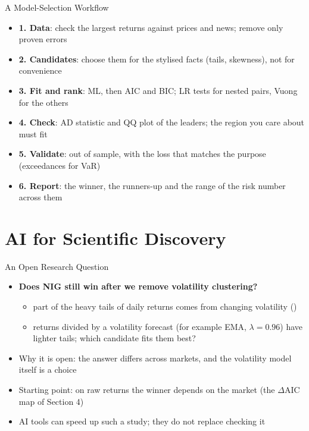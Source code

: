 \begin{frame}{A Model-Selection Workflow}
\itemsize{\small}
\begin{itemize}
    \item \textbf{1. Data}: check the largest returns against prices and news; remove only proven errors
    \item \textbf{2. Candidates}: choose them for the stylised facts (tails, skewness), not for convenience
    \item \textbf{3. Fit and rank}: ML, then AIC and BIC; LR tests for nested pairs, Vuong for the others
    \item \textbf{4. Check}: AD statistic and QQ plot of the leaders; the region you care about must fit
    \item \textbf{5. Validate}: out of sample, with the loss that matches the purpose (exceedances for VaR)
    \item \textbf{6. Report}: the winner, the runners-up and the range of the risk number across them
\end{itemize}
\end{frame}


\section{AI for Scientific Discovery}

\begin{frame}{An Open Research Question}
\itemsize{\small}
\begin{itemize}
    \item \textbf{Does NIG still win after we remove volatility clustering?}
    \begin{itemize}
        \item part of the heavy tails of daily returns comes from changing volatility ()
        \item returns divided by a volatility forecast (for example EMA, $\lambda = 0.96$) have lighter tails; which candidate fits them best?
    \end{itemize}
    \item Why it is open: the answer differs across markets, and the volatility model itself is a choice
    \item Starting point: on raw returns the winner depends on the market (the $\Delta$AIC map of Section 4)
    \item AI tools can speed up such a study; they do not replace checking it 
\end{itemize}
\end{frame}

